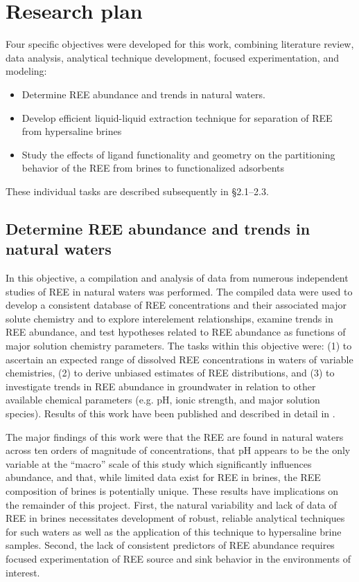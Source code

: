 \chapter{Research plan}
\vspace{-1cm}

Four specific objectives were developed for this work, combining literature review, data analysis, analytical technique development, focused experimentation, and modeling:

\begin{itemize}
	\item Determine REE abundance and trends in natural waters.
	\item	Develop efficient liquid-liquid extraction technique for separation of REE from hypersaline brines
	\item Study the effects of ligand functionality and geometry on the partitioning behavior of the REE from brines to functionalized adsorbents
\end{itemize}

These individual tasks are described subsequently in \S 2.1–2.3.

\section{Determine REE abundance and trends in natural waters}

In this objective, a compilation and analysis of data from numerous independent studies of REE in natural waters was performed.
The compiled data were used to develop a consistent database of REE concentrations and their associated major solute chemistry and to explore interelement relationships, examine trends in REE abundance, and test hypotheses related to REE abundance as functions of major solution chemistry parameters.
The tasks within this objective were: (1) to ascertain an expected range of dissolved REE concentrations in waters of variable chemistries, (2) to derive unbiased estimates of REE distributions, and (3) to investigate trends in REE abundance in groundwater in relation to other available chemical parameters (e.g. pH, ionic strength, and major solution species).
Results of this work have been published and described in detail in \citet{Noack_EST_2014}.

The major findings of this work were that the REE are found in natural waters across ten orders of magnitude of concentrations, that pH appears to be the only variable at the ``macro'' scale of this study which significantly influences abundance, and that, while limited data exist for REE in brines, the REE composition of brines is potentially unique.
These results have implications on the remainder of this project.
First, the natural variability and lack of data of REE in brines necessitates development of robust, reliable analytical techniques for such waters as well as the application of this technique to hypersaline brine samples.
Second, the lack of consistent predictors of REE abundance requires focused experimentation of REE source and sink behavior in the environments of interest.

